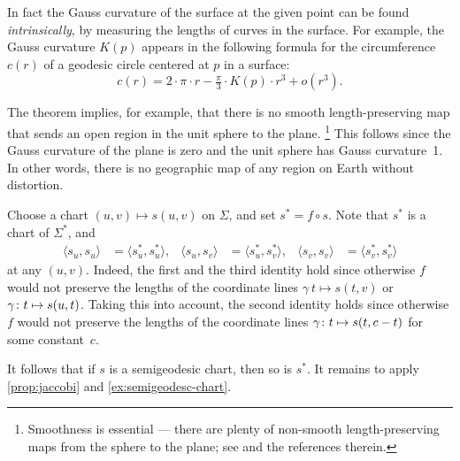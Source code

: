 In fact the Gauss curvature of the surface at the given point can be found {}\emph{intrinsically},
by measuring the lengths of curves in the surface.
For example, the Gauss curvature $K(p)$ appears in the following formula for the circumference $c(r)$ of a geodesic circle centered at $p$ in a surface: 
\[c(r)=2\cdot\pi\cdot r-\tfrac\pi3\cdot K(p)\cdot r^3+o(r^3).\]

The theorem implies, for example, that there is no smooth length-preserving map that sends an open region in the unit sphere to the plane.%
\footnote{Smoothness is essential --- there are plenty of non-smooth length-preserving maps from the sphere to the plane; see \cite{petrunin-yashinski} and the references therein.}
This follows since the Gauss curvature of the plane is zero and the unit sphere has Gauss curvature~1. 
In other words, there is no geographic map of any region on Earth without distortion.

Choose a chart $(u,v)\mapsto s(u,v)$ on $\Sigma$, and set
$s^{*} =f\circ s$.
Note that $s^{*}$ is a chart of $\Sigma^{*}$, and 
\begin{align*}
\langle s_u,s_u\rangle
&=
\langle s_u^{*}, s_u^{*}\rangle,
&
\langle s_u, s_v\rangle
&=
\langle s_u^{*}, s_v^{*}\rangle,
&
\langle s_v, s_v\rangle
&=
\langle s_v^{*}, s_v^{*}\rangle
\end{align*}
at any $(u,v)$.
Indeed, the first and the third identity hold since otherwise $f$ would not preserve the lengths of the coordinate lines $\gamma\:t\mapsto s(t,v)$ or  $\gamma\:t\z\mapsto s(u,t)$.
Taking this into account, the second identity holds since otherwise $f$ would not preserve the lengths of the coordinate lines $\gamma\:t\z\mapsto s(t,c-t)$ for some constant~$c$.

It follows that if $s$ is a semigeodesic chart,
then so is $s^{*}$.
It remains to apply \ref{prop:jaccobi} and \ref{ex:semigeodesc-chart}.
\qeds
